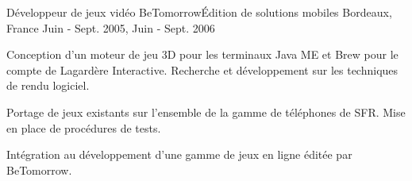 \begin{cventries}
  \cventry
    {Développeur de jeux vidéo}
    {BeTomorrow{\enskip\cdotp\enskip}Édition de solutions mobiles}
    {Bordeaux, France}
    {Juin - Sept. 2005, Juin - Sept. 2006}
    {
      \begin{cvitems}
        \item {Conception d'un moteur de jeu 3D pour les terminaux Java ME et Brew pour le compte de Lagardère Interactive. Recherche et développement sur les techniques de rendu logiciel. }
        \item {Portage de jeux existants sur l'ensemble de la gamme de téléphones de SFR. Mise en place de procédures de tests.}
        \item {Intégration au développement d'une gamme de jeux en ligne éditée par BeTomorrow.}
      \end{cvitems}
    }

\end{cventries}
